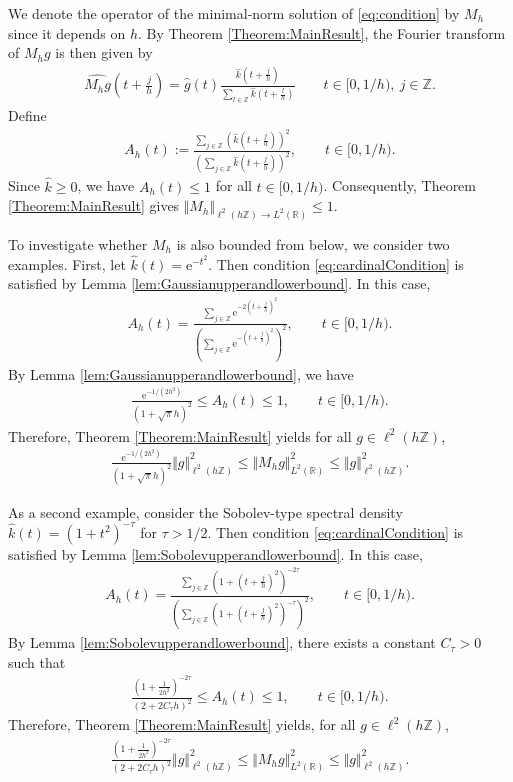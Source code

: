 \documentclass{article}
\newcommand{\R}{\mathbb{R}}
\newcommand{\Z}{\mathbb{Z}}
\newcommand{\e}{\mathrm{e}}
\begin{document}
We denote the operator of the minimal-norm solution of \eqref{eq:condition} by $M_h$ since it depends on $h$.
By Theorem \ref{Theorem:MainResult}, the Fourier transform of $M_h g$ is then given by 
\begin{align*}
    \widehat{M_h g}\left(t+\frac{j}{h} \right) =  \hat{g}(t) \frac{\hat{k}\left(t+\frac{j}{h} \right)}{\sum_{l \in \Z} \hat{k}\left( t+ \frac{l}{h} \right)} \qquad t\in[0,1/h),\ j\in\mathbb Z .
\end{align*}
Define 
\begin{align*}
    A_h(t):=\frac{\sum_{j \in \Z} \left( \hat{k}\left(t+\frac{j}{h} \right) \right)^2}{\left(\sum_{j \in \Z} \hat{k}\left( t+ \frac{j}{h} \right) \right)^2}, \qquad t\in[0,1/h).
\end{align*}
Since $\hat{k}\geq0$, we have  $A_h(t) \leq 1$ for all $ t \in [0,1/h)$. Consequently, Theorem \ref{Theorem:MainResult} gives $\Vert M_h \Vert_{\ell^2(h\Z ) \to L^2(\R)} \leq 1$. 

To investigate whether $M_h$ is also bounded from below, we consider two examples. First, let $\hat{k}(t)=\e^{-t^2}$. Then condition \eqref{eq:cardinalCondition} is satisfied by Lemma \ref{lem:Gaussianupperandlowerbound}. In this case, 
\begin{align*}
    A_h(t)=\frac{\sum_{j \in \Z} \e^{-2\left(t+\frac{j}{h}\right)^2}}{\left(\sum_{j \in \Z} \e^{-\left(t+\frac{j}{h} \right)^2} \right)^2}, \qquad t\in[0,1/h).
\end{align*}
By Lemma \ref{lem:Gaussianupperandlowerbound}, we have 
\begin{align*}
    \frac{\e^{-1/(2h^2)}}{(1+\sqrt{\pi}h)^2} \leq A_h(t) \leq 1, \qquad  t \in[0,1/h).
\end{align*}
Therefore, Theorem \ref{Theorem:MainResult} yields for all $g \in \ell^2(h \Z)$,
\begin{align*}
    \frac{\e^{-1/(2h^2)}}{(1+\sqrt{\pi}h)^2}    \Vert g \Vert_{\ell^2(h\Z)}^2 \leq \Vert M_h g \Vert_{L^2(\R)}^2 \leq \Vert g \Vert_{\ell^2(h \Z )}^2.
\end{align*}


As a second example, consider the Sobolev-type spectral density $\hat{k}(t)=(1+t^2)^{-\tau}$ for $\tau>1/2$. Then condition \eqref{eq:cardinalCondition} is satisfied by Lemma \ref{lem:Sobolevupperandlowerbound}. In this case, 
\begin{align*}
    A_h(t)= \frac{\sum_{j \in \Z} \left(1+\left(t+\frac{j}{h}\right)^2\right)^{-2\tau}}{\left(\sum_{j \in \Z} \left( 1+\left(t+\frac{j}{h}\right)^2\right)^{-\tau} \right)^2}, \qquad t\in[0,1/h).
\end{align*}
By Lemma \ref{lem:Sobolevupperandlowerbound}, there exists a constant $C_\tau>0$ such that
\begin{align*}
\frac{\left( 1+ \frac{1}{2h^2} \right)^{-2\tau}}{(2+2C_\tau h)^2}    \leq A_h(t) \leq 1, \qquad  t \in [0,1/h).
\end{align*} 
Therefore, Theorem \ref{Theorem:MainResult} yields, for all $g \in \ell^2(h \Z)$,
\begin{align*}
   \frac{\left( 1+ \frac{1}{2h^2} \right)^{-2\tau}}{(2+2C_\tau h)^2}  \Vert g \Vert_{\ell^2(h\Z)}^2 \leq \Vert M_h g \Vert_{L^2(\R)}^2 \leq \Vert g \Vert_{\ell^2(h \Z )}^2.
\end{align*}
\end{document}
